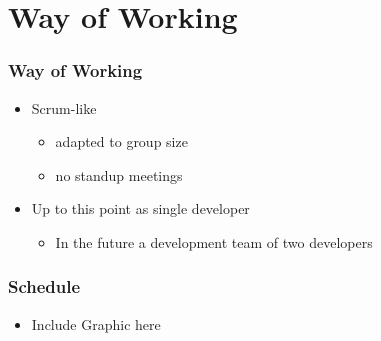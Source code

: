 \section{Way of Working}
\begin{frame}\frametitle{Way of Working}
	\begin{itemize}
		\item Scrum-like
		\begin{itemize}
			\item adapted to group size
			\item no standup meetings
		\end{itemize}
		\item Up to this point as single developer
		\begin{itemize}
			\item In the future a development team of two developers
		\end{itemize}
	\end{itemize}
\end{frame}
\begin{frame}\frametitle{Schedule}
	\begin{itemize}
		\item Include Graphic here
	\end{itemize}
\end{frame}